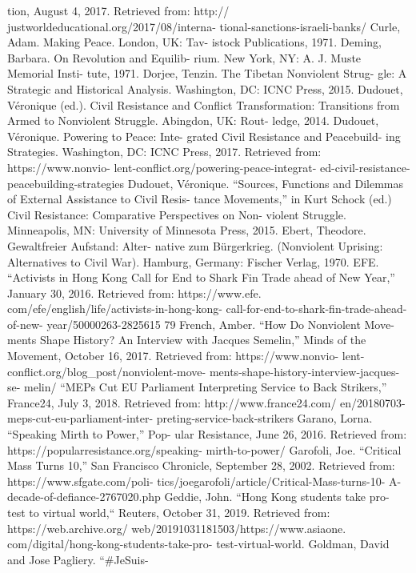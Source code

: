 \documentclass[twoside,a4paper,12pt,fleqn,openany]{extbook}
\begin{document}
tion, August 4, 2017. Retrieved from: http://
justworldeducational.org/2017/08/interna-
tional-sanctions-israeli-banks/
Curle, Adam. Making Peace. London, UK: Tav-
istock Publications, 1971.
Deming, Barbara. On Revolution and Equilib-
rium. New York, NY: A. J. Muste Memorial Insti-
tute, 1971.
Dorjee, Tenzin. The Tibetan Nonviolent Strug-
gle: A Strategic and Historical Analysis.
Washington, DC: ICNC Press, 2015.
Dudouet, Véronique (ed.). Civil Resistance and
Conflict Transformation: Transitions from Armed
to Nonviolent Struggle. Abingdon, UK: Rout-
ledge, 2014.
Dudouet, Véronique. Powering to Peace: Inte-
grated Civil Resistance and Peacebuild-
ing Strategies. Washington, DC: ICNC Press,
2017. Retrieved from: https://www.nonvio-
lent-conflict.org/powering-peace-integrat-
ed-civil-resistance-peacebuilding-strategies
Dudouet, Véronique. “Sources, Functions and
Dilemmas of External Assistance to Civil Resis-
tance Movements,” in Kurt Schock (ed.) Civil
Resistance: Comparative Perspectives on Non-
violent Struggle. Minneapolis, MN: University of
Minnesota Press, 2015.
Ebert, Theodore. Gewaltfreier Aufstand: Alter-
native zum Bürgerkrieg. (Nonviolent Uprising:
Alternatives to Civil War). Hamburg, Germany:
Fischer Verlag, 1970.
EFE. “Activists in Hong Kong Call for End to
Shark Fin Trade ahead of New Year,” January
30, 2016. Retrieved from: https://www.efe.
com/efe/english/life/activists-in-hong-kong-
call-for-end-to-shark-fin-trade-ahead-of-new-
year/50000263-2825615
79
French, Amber. “How Do Nonviolent Move-
ments Shape History? An Interview with Jacques
Semelin,” Minds of the Movement, October 16,
2017. Retrieved from: https://www.nonvio-
lent-conflict.org/blog_post/nonviolent-move-
ments-shape-history-interview-jacques-se-
melin/
“MEPs Cut EU Parliament Interpreting Service
to Back Strikers,” France24, July 3, 2018.
Retrieved from: http://www.france24.com/
en/20180703-meps-cut-eu-parliament-inter-
preting-service-back-strikers
Garano, Lorna. “Speaking Mirth to Power,” Pop-
ular Resistance, June 26, 2016. Retrieved from:
https://popularresistance.org/speaking-
mirth-to-power/
Garofoli, Joe. “Critical Mass Turns 10,” San
Francisco Chronicle, September 28, 2002.
Retrieved from: https://www.sfgate.com/poli-
tics/joegarofoli/article/Critical-Mass-turns-10-
A-decade-of-defiance-2767020.php
Geddie, John. “Hong Kong students take pro-
test to virtual world,“ Reuters, October 31, 2019.
Retrieved from: https://web.archive.org/
web/20191031181503/https://www.asiaone.
com/digital/hong-kong-students-take-pro-
test-virtual-world.
Goldman, David and Jose Pagliery. “#JeSuis-
\end{document}
